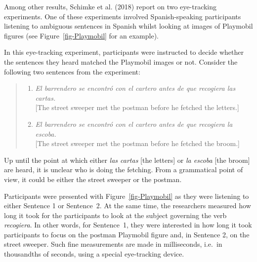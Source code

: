 \documentclass[
  letterpaper,
  DIV=11,
  numbers=noendperiod]{scrreprt}
\newcounter{quartocalloutnteno}
\newcommand{\quartocalloutnte}[1]{\refstepcounter{quartocalloutnteno}\label{#1}}
\begin{document}
Among other results, Schimke et al. (2018) report on two eye-tracking
experiments. One of these experiments involved Spanish-speaking
participants listening to ambiguous sentences in Spanish whilst looking
at images of Playmobil figures (see Figure~\ref{fig-Playmobil} for an
example).

\begin{tcolorbox}[enhanced jigsaw, arc=.35mm, bottomrule=.15mm, bottomtitle=1mm, breakable, colback=white, colbacktitle=quarto-callout-note-color!10!white, colframe=quarto-callout-note-color-frame, coltitle=black, left=2mm, leftrule=.75mm, opacityback=0, opacitybacktitle=0.6, rightrule=.15mm, title=\textcolor{quarto-callout-note-color}{\faInfo}\hspace{0.5em}{Note \ref*{nte-Eyetracking}: How did the experiment work?}, titlerule=0mm, toprule=.15mm, toptitle=1mm]

\quartocalloutnte{nte-Eyetracking} 

In this eye-tracking experiment, participants were instructed to decide
whether the sentences they heard matched the Playmobil images or not.
Consider the following two sentences from the experiment:

\begin{quote}
\begin{enumerate}
\def\labelenumi{\arabic{enumi}.}
\item
  \emph{El barrendero se encontró con el cartero antes de que recogiera
  las cartas.}\\
  {[}The street sweeper met the postman before he fetched the
  letters.{]}
\item
  \emph{El barrendero se encontró con el cartero antes de que recogiera
  la escoba.}\\
  {[}The street sweeper met the postman before he fetched the broom.{]}
\end{enumerate}
\end{quote}

Up until the point at which either \emph{las cartas} {[}the letters{]}
or \emph{la escoba} {[}the broom{]} are heard, it is unclear who is
doing the fetching. From a grammatical point of view, it could be either
the street sweeper or the postman.

Participants were presented with Figure~\ref{fig-Playmobil} as they were
listening to either Sentence 1 or Sentence~2. At the same time, the
researchers measured how long it took for the participants to look at
the subject governing the verb \emph{recogiera}. In other words, for
Sentence~1, they were interested in how long it took participants to
focus on the postman Playmobil figure and, in Sentence 2, on the street
sweeper. Such fine measurements are made in milliseconds, i.e.~in
thousandths of seconds, using a special eye-tracking device.


\end{tcolorbox}
\end{document}

